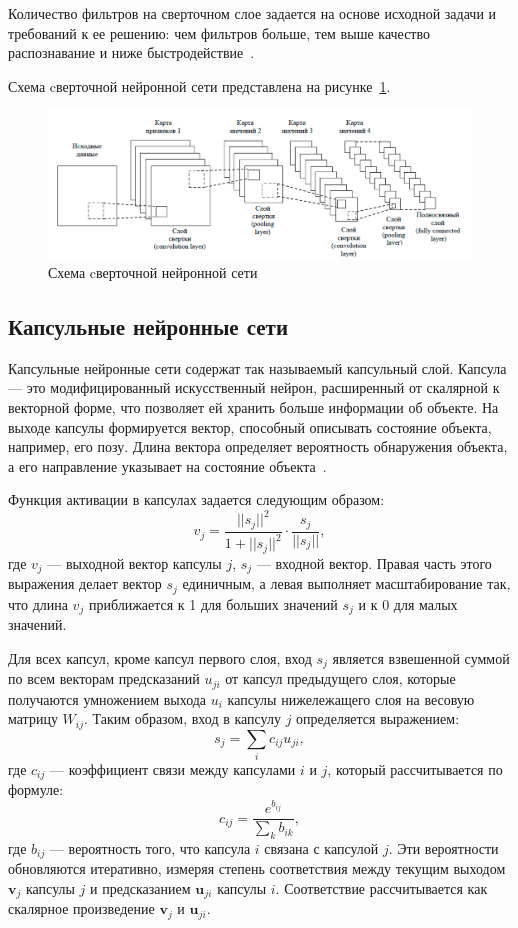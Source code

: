 Количество фильтров на сверточном слое задается на основе исходной задачи и требований к ее решению: чем фильтров больше, тем выше качество распознавание и ниже быстродействие~\cite{cnn_more}.

Схема cверточной нейронной сети представлена на рисунке~\ref{cnn_sheme}.

\begin{figure}[H]
    \centering
    \includegraphics[width=0.8\linewidth]{images/cnn.png}
    \caption{Схема cверточной нейронной сети}
    \label{cnn_sheme}
\end{figure}

\subsection{Капсульные нейронные сети}

Капсульные нейронные сети содержат так называемый капсульный слой. Капсула — это модифицированный искусственный нейрон, расширенный от скалярной к векторной форме, что позволяет ей хранить больше информации об объекте. На выходе капсулы формируется вектор, способный описывать состояние объекта, например, его позу. Длина вектора определяет вероятность обнаружения объекта, а его направление указывает на состояние объекта~\cite{capsnet}.

Функция активации в капсулах задается следующим образом:
$$
v_j = \frac{{||s_j||^2}}{{1 + ||s_j||^2}} \cdot \frac{{s_j}}{{||s_j||}},
$$
где $v_j$ — выходной вектор капсулы $j$, $s_j$ — входной вектор. Правая часть этого выражения делает вектор $s_j$ единичным, а левая выполняет масштабирование так, что длина $v_j$ приближается к 1 для больших значений $s_j$ и к 0 для малых значений.

Для всех капсул, кроме капсул первого слоя, вход $s_j$ является взвешенной суммой по всем векторам предсказаний $u_{ji}$ от капсул предыдущего слоя, которые получаются умножением выхода $u_i$ капсулы нижележащего слоя на весовую матрицу $W_{ij}$. Таким образом, вход в капсулу $j$ определяется выражением:
$$
s_j = \sum_i c_{ij} u_{ji},
$$
где $c_{ij}$ — коэффициент связи между капсулами $i$ и $j$, который рассчитывается по формуле:
$$
c_{ij} = \frac{e^{b_{ij}}}{\sum_k b_{ik}},
$$
где $b_{ij}$ — вероятность того, что капсула $i$ связана с капсулой $j$. Эти вероятности обновляются итеративно, измеряя степень соответствия между текущим выходом $\mathbf{v}_j$ капсулы $j$ и предсказанием $\mathbf{u}_{ji}$ капсулы $i$. Соответствие рассчитывается как скалярное произведение $\mathbf{v}_j$ и $\mathbf{u}_{ji}$.

